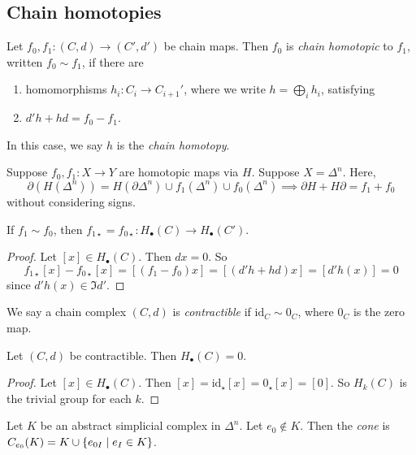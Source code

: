 \subsection{Chain homotopies}
\begin{definition}
	Let \( f_0, f_1 \colon (C, d) \to (C', d') \) be chain maps.
	Then \( f_0 \) is \emph{chain homotopic} to \( f_1 \), written \( f_0 \sim f_1 \), if there are
	\begin{enumerate}
		\item homomorphisms \( h_i \colon C_i \to C_{i+1}' \), where we write \( h = \bigoplus_i h_i \), satisfying
		\item \( d'h + hd = f_0 - f_1 \).
	\end{enumerate}
	In this case, we say \( h \) is the \emph{chain homotopy}.
\end{definition}
\begin{example}
	Suppose \( f_0, f_1 \colon X \to Y \) are homotopic maps via \( H \).
	Suppose \( X = \Delta^n \).
	Here,
	\[ \partial(H(\Delta^n)) = H(\partial\Delta^n) \cup f_1(\Delta^n) \cup f_0(\Delta^n) \implies \partial H + H \partial = f_1 + f_0 \]
	without considering signs.
\end{example}
\begin{lemma}
	If \( f_1 \sim f_0 \), then \( f_{1\star} = f_{0\star} \colon H_\bullet(C) \to H_\bullet(C') \).
\end{lemma}
\begin{proof}
	Let \( [x] \in H_\bullet(C) \).
	Then \( dx = 0 \).
	So
	\[ f_{1\star}[x] - f_{0\star}[x] = [(f_1 - f_0)x] = [(d'h + hd)x] = [d'h(x)] = 0 \]
	since \( d'h(x) \in \Im d' \).
\end{proof}
\begin{definition}
	We say a chain complex \( (C, d) \) is \emph{contractible} if \( \mathrm{id}_C \sim 0_C \), where \( 0_C \) is the zero map.
\end{definition}
\begin{lemma}
	Let \( (C, d) \) be contractible.
	Then \( H_\bullet(C) = 0 \).
\end{lemma}
\begin{proof}
	Let \( [x] \in H_\bullet(C) \).
	Then \( [x] = \mathrm{id}_\star[x] = 0_\star[x] = [0] \).
	So \( H_k(C) \) is the trivial group for each \( k \).
\end{proof}
\begin{definition}
	Let \( K \) be an abstract simplicial complex in \( \Delta^n \).
	Let \( e_0 \not\in K \).
	Then the \emph{cone} is \( C_{e_0}(K) = K \cup \qty{e_{0I} \mid e_I \in K} \).
\end{definition}
